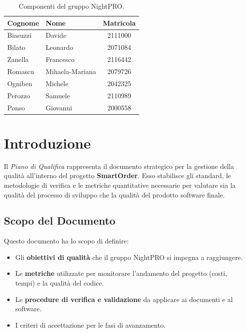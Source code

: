 \documentclass[a4paper,11pt,oneside]{scrartcl}
\begin{document}
\begin{table}[h!]
\centering
\renewcommand{\arraystretch}{1.2}
\begin{tabular}{@{}llc@{}}
\toprule
\textbf{Cognome} & \textbf{Nome} & \textbf{Matricola} \\
\midrule
Biasuzzi & Davide & 2111000 \\
Bilato & Leonardo & 2071084 \\
Zanella & Francesco & 2116442 \\
Romascu & Mihaela-Mariana & 2079726 \\
Ogniben & Michele & 2042325 \\
Perozzo & Samuele & 2110989 \\
Ponso & Giovanni & 2000558 \\
\bottomrule
\end{tabular}
\caption{Componenti del gruppo NightPRO.}
\end{table}

\newpage
\section{Introduzione}

Il \textit{Piano di Qualifica} rappresenta il documento strategico per la gestione della qualità all'interno del progetto \textbf{SmartOrder}. Esso stabilisce gli standard, le metodologie di verifica e le metriche quantitative necessarie per valutare sia la qualità del processo di sviluppo che la qualità del prodotto software finale.

\subsection{Scopo del Documento}
Questo documento ha lo scopo di definire:
\begin{itemize}
    \item Gli \textbf{obiettivi di qualità} che il gruppo NightPRO si impegna a raggiungere.
    \item Le \textbf{metriche} utilizzate per monitorare l'andamento del progetto (costi, tempi) e la qualità del codice.
    \item Le \textbf{procedure di verifica e validazione} da applicare ai documenti e al software.
    \item I criteri di accettazione per le fasi di avanzamento.
\end{itemize}
\end{document}
